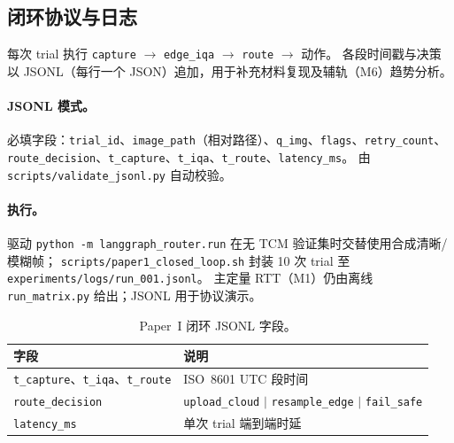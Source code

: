 \subsection{闭环协议与日志}
\label{sec:closed-loop-zh}

每次 trial 执行 \texttt{capture} $\rightarrow$ \texttt{edge\_iqa} $\rightarrow$ \texttt{route} $\rightarrow$ 动作。
各段时间戳与决策以 JSONL（每行一个 JSON）追加，用于补充材料复现及辅轨（M6）趋势分析。

\paragraph{JSONL 模式。}
必填字段：\texttt{trial\_id}、\texttt{image\_path}（相对路径）、\texttt{q\_img}、\texttt{flags}、\texttt{retry\_count}、\texttt{route\_decision}、\texttt{t\_capture}、\texttt{t\_iqa}、\texttt{t\_route}、\texttt{latency\_ms}。
由 \texttt{scripts/validate\_jsonl.py} 自动校验。

\paragraph{执行。}
驱动 \texttt{python -m langgraph\_router.run} 在无 TCM 验证集时交替使用合成清晰/模糊帧；
\texttt{scripts/paper1\_closed\_loop.sh} 封装 10 次 trial 至 \texttt{experiments/logs/run\_001.jsonl}。
主定量 RTT（M1）仍由离线 \texttt{run\_matrix.py} 给出；JSONL 用于协议演示。

\begin{table}[t]
\centering
\caption{Paper~I 闭环 JSONL 字段。}
\begin{tabular}{ll}
\hline
字段 & 说明 \\
\hline
\texttt{t\_capture}、\texttt{t\_iqa}、\texttt{t\_route} & ISO~8601 UTC 段时间 \\
\texttt{route\_decision} & \texttt{upload\_cloud} $|$ \texttt{resample\_edge} $|$ \texttt{fail\_safe} \\
\texttt{latency\_ms} & 单次 trial 端到端时延 \\
\hline
\end{tabular}
\end{table}
